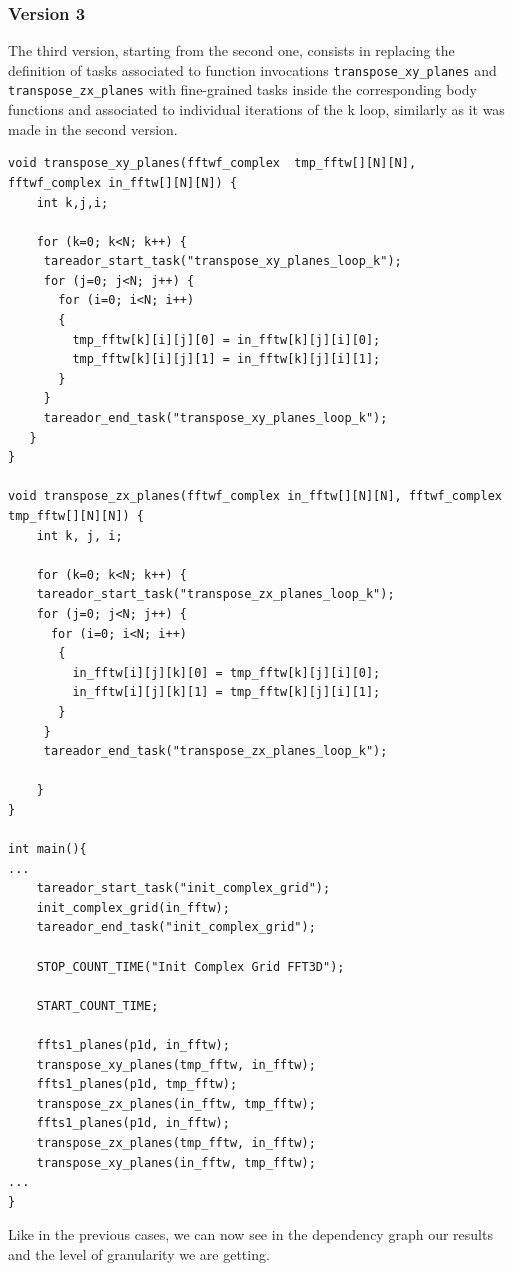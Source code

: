 \documentclass[12]{article}
\begin{document}
\subsubsection{Version 3}
The third version, starting from the second one, consists in replacing the definition of tasks associated to function invocations \texttt{transpose\_xy\_planes} and \texttt{transpose\_zx\_planes} with fine-grained tasks inside the corresponding body functions and associated to individual iterations of the k loop, similarly as it was made in the second version. 
\begin{lstlisting}
void transpose_xy_planes(fftwf_complex  tmp_fftw[][N][N], fftwf_complex in_fftw[][N][N]) {
    int k,j,i;

    for (k=0; k<N; k++) {
     tareador_start_task("transpose_xy_planes_loop_k");
     for (j=0; j<N; j++) {
       for (i=0; i<N; i++)
       {
         tmp_fftw[k][i][j][0] = in_fftw[k][j][i][0];
         tmp_fftw[k][i][j][1] = in_fftw[k][j][i][1];
       }
     }
     tareador_end_task("transpose_xy_planes_loop_k"); 
   }
}

void transpose_zx_planes(fftwf_complex in_fftw[][N][N], fftwf_complex tmp_fftw[][N][N]) {
    int k, j, i;

    for (k=0; k<N; k++) {
    tareador_start_task("transpose_zx_planes_loop_k");
    for (j=0; j<N; j++) {
      for (i=0; i<N; i++)
       {
         in_fftw[i][j][k][0] = tmp_fftw[k][j][i][0];
         in_fftw[i][j][k][1] = tmp_fftw[k][j][i][1];
       }
     }
     tareador_end_task("transpose_zx_planes_loop_k");

    }
}

int main(){
...
    tareador_start_task("init_complex_grid");
    init_complex_grid(in_fftw);
    tareador_end_task("init_complex_grid");

    STOP_COUNT_TIME("Init Complex Grid FFT3D");

    START_COUNT_TIME;

    ffts1_planes(p1d, in_fftw);
    transpose_xy_planes(tmp_fftw, in_fftw);
    ffts1_planes(p1d, tmp_fftw);
    transpose_zx_planes(in_fftw, tmp_fftw);
    ffts1_planes(p1d, in_fftw);
    transpose_zx_planes(tmp_fftw, in_fftw);
    transpose_xy_planes(in_fftw, tmp_fftw);
...
}
\end{lstlisting}

Like in the previous cases, we can now see in the dependency graph our results and the level of granularity we are getting. 
\end{document}
